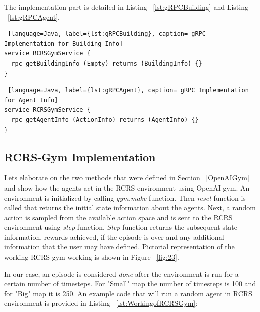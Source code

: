 \documentclass[12pt]{report}
\begin{document}
The implementation part is detailed in Listing ~\ref{lst:gRPCBuilding} and Listing ~\ref{lst:gRPCAgent}. 

\begin{lstlisting} [language=Java, label={lst:gRPCBuilding}, caption= gRPC Implementation for Building Info] 
service RCRSGymService {
  rpc getBuildingInfo (Empty) returns (BuildingInfo) {}
}
\end{lstlisting}

\begin{lstlisting} [language=Java, label={lst:gRPCAgent}, caption= gRPC Implementation for Agent Info] 
service RCRSGymService {
  rpc getAgentInfo (ActionInfo) returns (AgentInfo) {}
}
\end{lstlisting}

\subsection{RCRS-Gym Implementation} \label{RCRSGymImplementation}

Lets elaborate on the two methods that were defined in Section ~\ref{OpenAIGym} and show how the agents act in the RCRS environment using OpenAI gym. An environment is initialized by calling \emph{gym.make} function. Then \emph{reset} function is called that returns the initial state information about the agents. Next, a random action is sampled from the available action space and is sent to the RCRS environment using \emph{step} function. \emph{Step} function returns the subsequent state information, rewards achieved, if the episode is over and any additional information that the user may have defined. Pictorial representation of the working RCRS-gym working is shown in Figure ~\ref{fig:23}. 

In our case, an episode is considered \emph{done} after the environment is run for a certain number of timesteps. For "Small" map the number of timesteps is 100 and for "Big" map it is 250. An example code that will run a random agent in RCRS environment is provided in Listing ~\ref{lst:WorkingofRCRSGym}:


\end{document}

